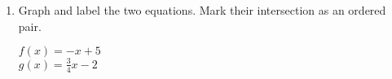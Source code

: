 \begin{enumerate}
\item Graph and label the two equations. Mark their intersection as an ordered pair.
  \begin{multicols}{2}
    $f(x) = -x+5$ \\
    $g(x) = \frac{3}{4}x-2$
  \end{multicols}
  \begin{center}
  \end{center}

\end{enumerate}
